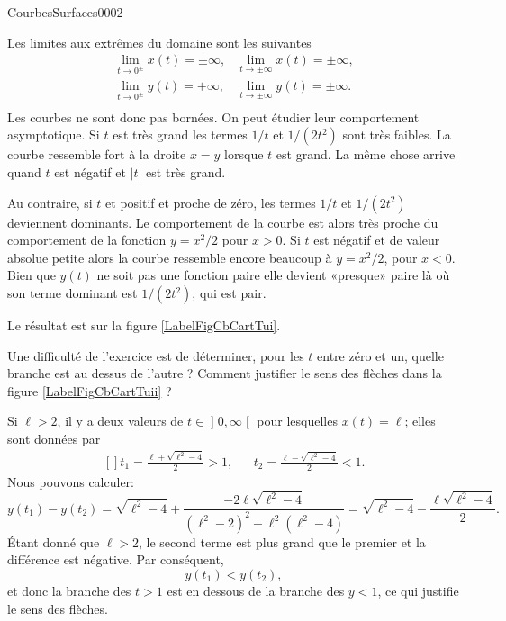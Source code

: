 \begin{corrige}{CourbesSurfaces0002}
\begin{enumerate}
Les limites aux extrêmes du domaine sont les suivantes
\begin{equation}
  \begin{array}{ll}
    \lim_{t\to 0^{\pm}}x(t)=\pm \infty, & \lim_{t\to \pm\infty}x(t)=\pm \infty,\\
    \lim_{t\to 0^{\pm}}y(t)=+ \infty, & \lim_{t\to \pm\infty}y(t)=\pm \infty.\\
  \end{array}
\end{equation}
Les courbes ne sont donc pas bornées. On peut étudier leur comportement asymptotique. Si $t$ est très grand les termes $1/t$ et $1/(2t^2)$ sont très faibles. La courbe ressemble fort à la droite $x=y$ lorsque $t$ est grand. La même chose arrive quand $t$ est négatif et $|t|$ est très grand. 

Au contraire, si $t$ et positif et proche de zéro, les termes $1/t$ et $1/(2t^2)$ deviennent dominants. Le comportement de la courbe est alors très proche du comportement de la fonction $y=x^2/2$ pour $x>0$. Si $t$ est négatif et de valeur absolue petite alors la courbe ressemble encore beaucoup à $y=x^2/2$, pour $x<0$. Bien que $y(t)$ ne soit  pas une fonction paire elle devient «presque» paire là où son terme dominant est $1/(2t^2)$, qui est pair.

Le résultat est sur la figure \ref{LabelFigCbCartTui}.
\newcommand{\CaptionFigCbCartTui}{La courbe de l'exercice \ref{exoCourbesSurfaces0002}\ref{Itemzzdexoi}}


Une difficulté de l'exercice est de déterminer, pour les \( t\) entre zéro et un, quelle branche est au dessus de l'autre ? Comment justifier le sens des flèches dans la figure \ref{LabelFigCbCartTuii} ?

Si \( \ell>2\), il y a deux valeurs de \( t\in\mathopen] 0 , \infty \mathclose[\) pour lesquelles \( x(t)=\ell\); elles sont données par
\begin{equation}
    \begin{aligned}[]
        t_1=\frac{ \ell+\sqrt{\ell^2-4} }{ 2 }>1,&&t_2=\frac{ \ell-\sqrt{\ell^2-4} }{ 2 }<1.
    \end{aligned}
\end{equation}
Nous pouvons calculer:
\begin{equation}
    y(t_1)-y(t_2)=\sqrt{\ell^2-4}+\frac{ -2\ell\sqrt{\ell^2-4} }{ (\ell^2-2)^2-\ell^2(\ell^2-4) }=\sqrt{\ell^2-4}-\frac{ \ell\sqrt{\ell^2-4} }{ 2 }.
\end{equation}
Étant donné que \( \ell>2\), le second terme est plus grand que le premier et la différence est négative. Par conséquent,
\begin{equation}
    y(t_1)<y(t_2),
\end{equation}
et donc la branche des \( t>1\) est en dessous de la branche des \( y<1\), ce qui justifie le sens des flèches.



\end{enumerate}
\end{corrige}
